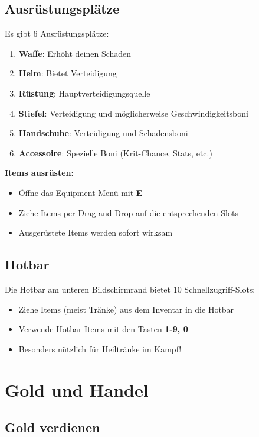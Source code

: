 \documentclass[
  a4paper,
  11pt,
  ngerman,
  parskip=half,
  bibliography=totoc,
  listof=totoc
]{scrreprt}
\begin{document}
\subsection{Ausrüstungsplätze}

Es gibt 6 Ausrüstungsplätze:
\begin{enumerate}
    \item \textbf{Waffe}: Erhöht deinen Schaden
    \item \textbf{Helm}: Bietet Verteidigung
    \item \textbf{Rüstung}: Hauptverteidigungsquelle
    \item \textbf{Stiefel}: Verteidigung und möglicherweise Geschwindigkeitsboni
    \item \textbf{Handschuhe}: Verteidigung und Schadensboni
    \item \textbf{Accessoire}: Spezielle Boni (Krit-Chance, Stats, etc.)
\end{enumerate}

\textbf{Items ausrüsten}:
\begin{itemize}
    \item Öffne das Equipment-Menü mit \textbf{E}
    \item Ziehe Items per Drag-and-Drop auf die entsprechenden Slots
    \item Ausgerüstete Items werden sofort wirksam
\end{itemize}

\subsection{Hotbar}

Die Hotbar am unteren Bildschirmrand bietet 10 Schnellzugriff-Slots:
\begin{itemize}
    \item Ziehe Items (meist Tränke) aus dem Inventar in die Hotbar
    \item Verwende Hotbar-Items mit den Tasten \textbf{1-9, 0}
    \item Besonders nützlich für Heiltränke im Kampf!
\end{itemize}

\section{Gold und Handel}

\subsection{Gold verdienen}
\end{document}
